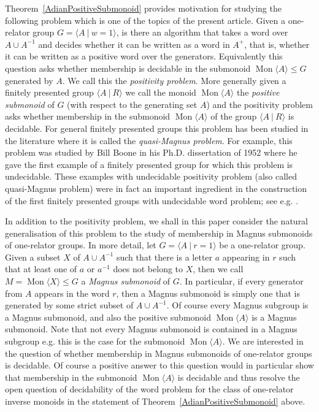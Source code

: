 \documentclass[11pt]{amsart}
\newcommand{\Mgen}[1]{\operatorname{Mon}\bigl\langle #1 \bigr\rangle}
\newcommand{\Gpres}[2]{\bigl\langle #1\:|\:#2 \bigr\rangle}
\theoremstyle{plain}
\theoremstyle{definition}
\begin{document}
Theorem~\ref{AdianPositiveSubmonoid} provides motivation for studying the following problem which is one of the topics of the present article. Given a one-relator group $G=\Gpres{A}{w=1}$, is there an algorithm that takes a word over $A \cup A^{-1}$ and decides whether it can be written as a word in $A^+$, that is, whether it can be written as a positive word over the generators. Equivalently this question asks whether membership is decidable in the submonoid $\Mgen{A} \leq G$ generated by $A$. We call this the \emph{positivity problem}. 
More generally given a finitely presented group $\Gpres{A}{R}$ we call the monoid $\Mgen{A}$ the \emph{positive submonoid} of $G$ (with respect to the generating set $A$) and the positivity problem asks whether membership in the submonoid $\Mgen{A}$ of the group  $\Gpres{A}{R}$ is decidable. 
For general finitely presented groups this problem has been studied in the literature where it is called the \emph{quasi-Magnus problem}. For example, this problem was studied by Bill Boone in his Ph.D. dissertation of 1952 where he gave the first example of a finitely presented group for which this problem is undecidable. These examples with undecidable positivity problem (also called quasi-Magnus problem) were in fact an important ingredient in the construction of the first finitely presented groups with undecidable word problem; see e.g. 
\cite{stillwell1982word}. 

In addition to the positivity problem, we shall in this paper consider the natural generalisation of this problem to the study of membership in Magnus submonoids of one-relator groups. 
In more detail, let $G = \Gpres{A}{r=1}$ be a one-relator group. Given a subset $X$ of $A \cup A^{-1}$ such that there is a letter $a$ appearing in $r$ such that at least one of $a$ or $a^{-1}$ does not belong to $X$, then we call $M = \Mgen{X} \leq G$ a \emph{Magnus submonoid} of $G$. 
In particular, if every generator from $A$ appears in the word $r$, then a Magnus submonoid is simply one that is generated by some strict subset of $A \cup A^{-1}$.
Of course every Magnus subgroup is a Magnus submonoid, and also the positive submonoid $\Mgen{A}$ is a Magnus submonoid. 
Note that not every Magnus submonoid is contained in a Magnus subgroup e.g. this is the case for the submonoid $\Mgen{A}$.  We are interested in the question of whether membership in Magnus submonoids of one-relator groups is decidable. Of course a positive answer to this question would in particular show that membership in the submonoid $\Mgen{A}$ is decidable and thus resolve the open question of decidability of the word problem for the class of one-relator inverse monoids in the statement of Theorem~\ref{AdianPositiveSubmonoid} above.  
\end{document}
